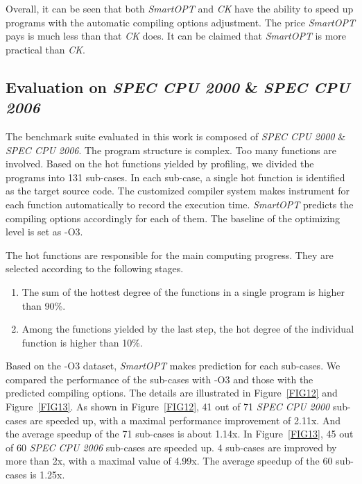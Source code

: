 \documentclass[bst/sn-mathphys]{sn-jnl}%
\theoremstyle{thmstyleone}%
\theoremstyle{thmstyletwo}%
\theoremstyle{thmstylethree}%
\begin{document}
Overall, it can be seen that both \emph{SmartOPT} and \emph{CK} have the 
ability to speed up programs with the automatic compiling options adjustment. 
The price \emph{SmartOPT} pays is much less than that \emph{CK} does. It can be 
claimed that \emph{SmartOPT} is more practical than \emph{CK}.

\subsection{Evaluation on \emph{SPEC CPU 2000} \& \emph{SPEC CPU 2006}}

The benchmark suite evaluated in this work is composed of 
\emph{SPEC CPU 2000} \& \emph{SPEC CPU 2006}. The program structure is complex. 
Too many functions are involved. Based on the hot functions yielded by 
profiling, we divided the programs into 131 sub-cases. In each sub-case, a 
single hot function is identified as the target source code. The customized 
compiler system makes instrument for each function automatically to record the 
execution time. \emph{SmartOPT} predicts the compiling options accordingly for 
each of them. The baseline of the optimizing level is set as -O3.

The hot functions are responsible for the main computing progress. They are 
selected according to the following stages.

\begin{enumerate}[1.]
\item The sum of the hottest degree of the functions in a single program is 
	higher than 90\%.
\item Among the functions yielded by the last step, the hot degree of the 
	individual function is higher than 10\%.
\end{enumerate}

Based on the -O3 dataset, \emph{SmartOPT} makes prediction for each sub-cases. 
We compared the performance of the sub-cases with -O3 and those with the 
predicted compiling options. The details are illustrated in Figure~\ref{FIG12} 
and Figure~\ref{FIG13}. As shown in Figure~\ref{FIG12}, 41 out of 71 \emph{SPEC CPU 2000} sub-cases are speeded up, with a maximal performance improvement of 
2.11x. And the average speedup of the 71 sub-cases is about 1.14x. In 
Figure~\ref{FIG13}, 45 out of 60 \emph{SPEC CPU 2006} sub-cases are speeded up. 
4 sub-cases are improved by more than 2x, with a maximal value of 4.99x. The 
average speedup of the 60 sub-cases is 1.25x.
\end{document}
